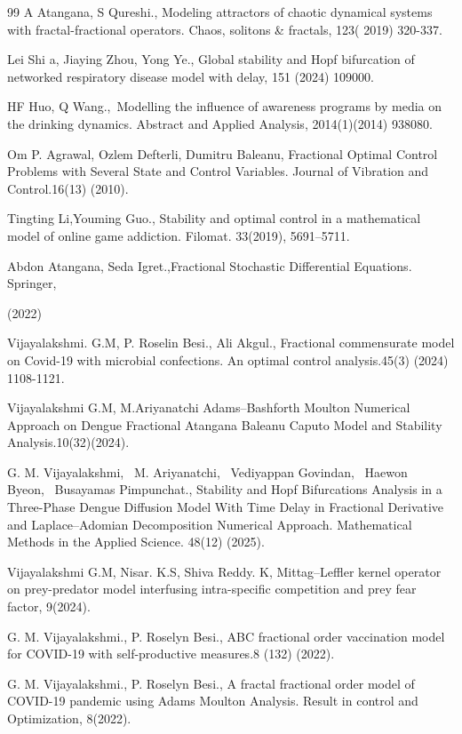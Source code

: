 \documentclass[10pt]{NSP1}
\numberwithin{equation}{section}
\begin{document}
\begin{thebibliography}{99}
A Atangana, S Qureshi., Modeling attractors of chaotic dynamical systems with fractal-fractional operators. Chaos, solitons \& fractals, 123( 2019) 320-337.

Lei Shi a, Jiaying Zhou, Yong Ye., Global stability and Hopf bifurcation of networked respiratory disease model with delay, 151 (2024) 109000.

HF Huo, Q Wang., Modelling the inﬂuence of awareness programs by media on the drinking dynamics. Abstract and Applied Analysis, 2014(1)(2014) 938080.

Om P. Agrawal, Ozlem Defterli, Dumitru Baleanu, Fractional Optimal Control Problems with Several State and Control Variables. Journal of Vibration and Control.16(13) (2010).

Tingting Li,Youming Guo., Stability and optimal control in a mathematical model of online game addiction. Filomat. 33(2019), 5691–5711.

Abdon Atangana, Seda Igret.,Fractional Stochastic Diﬀerential Equations. Springer,

(2022)

Vijayalakshmi. G.M, P. Roselin Besi., Ali Akgul., Fractional commensurate model on Covid-19 with microbial confections. An optimal control analysis.45(3) (2024) 1108-1121.

Vijayalakshmi G.M, M.Ariyanatchi Adams–Bashforth Moulton Numerical Approach on Dengue Fractional Atangana Baleanu Caputo Model and Stability Analysis.10(32)(2024).

G. M. Vijayalakshmi,  M. Ariyanatchi,  Vediyappan Govindan,  Haewon Byeon,  Busayamas Pimpunchat., Stability and Hopf Bifurcations Analysis in a Three-Phase Dengue Diffusion Model With Time Delay in Fractional Derivative and Laplace–Adomian Decomposition Numerical Approach. Mathematical Methods in the Applied Science. 48(12) (2025).

Vijayalakshmi G.M, Nisar. K.S, Shiva Reddy. K, Mittag–Leffler kernel operator on prey-predator model interfusing intra-specific competition and prey fear factor, 9(2024).

G. M. Vijayalakshmi., P. Roselyn Besi., ABC fractional order vaccination model for COVID-19 with self-productive measures.8 (132) (2022).

G. M. Vijayalakshmi., P. Roselyn Besi., A fractal fractional order model of COVID-19 pandemic using Adams Moulton Analysis. Result in control and Optimization, 8(2022).

\end{thebibliography}
\end{document}
